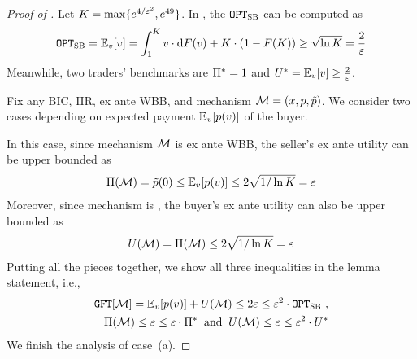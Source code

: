 \begin{proof}[Proof of ]
    Let $K = \max\{e^{4/\varepsilon^2},e^{49}\}$. In , the {\SecondBest} $\texttt{OPT}_{\textsc{SB}}$ can be computed as 
    \begin{align*}
        \OPTSB = \expect[\val]{\val} = 
        \displaystyle\int_1^{\constantH}\val\cdot \d \buyercdf(\val) + \constantH\cdot (1 - \buyercdf(\constantH)) \geq  
        \sqrt{\ln\constantH}
        =
        \frac{2}{\eps}
    \end{align*}
    Meanwhile, two traders' benchmarks are $\Pi^* = 1$ and $\buyerbenchmark = \expect[\val]{\val} \geq \frac{2}{\eps}$. 
    
    Fix any BIC, IIR, ex ante WBB, and {\equitable} mechanism $\mathcal{M} = (x, p, \tilde{p})$. We consider two cases depending on expected payment $\expect[\val]{\price(\val)}$ of the buyer.

     In this case, since mechanism $\mathcal{M}$ is ex ante WBB, the seller's ex ante utility can be upper bounded as 
    \begin{align*}
        \sellerexanteutil(\mech) = \sellerprice(0) \leq \expect[\val]{\price(\val)} \leq 2 \sqrt{1 / \ln\constantH} = \eps
    \end{align*}
    Moreover, since mechanism is {\equitable}, the buyer's ex ante utility can also be upper bounded as 
    \begin{align*}
        U(\mathcal{M}) = \Pi(\mathcal{M}) \leq 2 \sqrt{1 / \ln K} = \varepsilon
    \end{align*}
    Putting all the pieces together, we show all three inequalities in the lemma statement, i.e.,
    \begin{align*}
        \GFT{\mech} = \expect[\val]{\price(\val)} + \buyerexanteutil(\mech)
        \leq 2\eps \leq \eps^2 \cdot \OPTSB~,
        \\
        \sellerexanteutil(\mech) \leq \eps \leq \eps\cdot \sellerbenchmark
        \;\;\mbox{and}\;\;
        \buyerexanteutil(\mech) \leq \eps \leq \eps^2\cdot \buyerbenchmark
    \end{align*}
    We finish the analysis of case~(a).
    

\end{proof}
